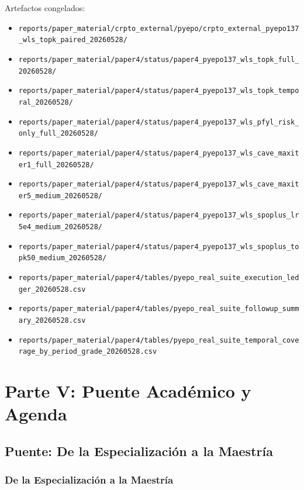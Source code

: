 \documentclass[
  spanish,
  11pt,
  letterpaper,
]{scrbook}
\providecommand{\tightlist}{%
  \setlength{\itemsep}{0pt}\setlength{\parskip}{0pt}}
\theoremstyle{plain}
\theoremstyle{remark}
\begin{document}
Artefactos congelados:

\begin{itemize}
\tightlist
\item
  \texttt{reports/paper\_material/crpto\_external/pyepo/crpto\_external\_pyepo137\_wls\_topk\_paired\_20260528/}
\item
  \texttt{reports/paper\_material/paper4/status/paper4\_pyepo137\_wls\_topk\_full\_20260528/}
\item
  \texttt{reports/paper\_material/paper4/status/paper4\_pyepo137\_wls\_topk\_temporal\_20260528/}
\item
  \texttt{reports/paper\_material/paper4/status/paper4\_pyepo137\_wls\_pfyl\_risk\_only\_full\_20260528/}
\item
  \texttt{reports/paper\_material/paper4/status/paper4\_pyepo137\_wls\_cave\_maxiter1\_full\_20260528/}
\item
  \texttt{reports/paper\_material/paper4/status/paper4\_pyepo137\_wls\_cave\_maxiter5\_medium\_20260528/}
\item
  \texttt{reports/paper\_material/paper4/status/paper4\_pyepo137\_wls\_spoplus\_lr5e4\_medium\_20260528/}
\item
  \texttt{reports/paper\_material/paper4/status/paper4\_pyepo137\_wls\_spoplus\_topk50\_medium\_20260528/}
\item
  \texttt{reports/paper\_material/paper4/tables/pyepo\_real\_suite\_execution\_ledger\_20260528.csv}
\item
  \texttt{reports/paper\_material/paper4/tables/pyepo\_real\_suite\_followup\_summary\_20260528.csv}
\item
  \texttt{reports/paper\_material/paper4/tables/pyepo\_real\_suite\_temporal\_coverage\_by\_period\_grade\_20260528.csv}
\end{itemize}

\part{Parte V: Puente Académico y Agenda}

\chapter{Puente: De la Especialización a la
Maestría}\label{puente-de-la-especializaciuxf3n-a-la-maestruxeda}

\section{De la Especialización a la
Maestría}\label{sec-bridge-specialization}
\end{document}
